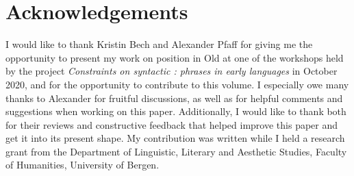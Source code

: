 \documentclass[output=paper,colorlinks,citecolor=brown]{langscibook}
\begin{document}
\section*{Acknowledgements}
I would like to thank Kristin Bech and Alexander Pfaff for giving me the opportunity to present my work on  position in Old  at one of the workshops held by the project \textit{Constraints on syntactic :  phrases in early  languages} in October 2020, and for the opportunity to contribute to this volume. I especially owe many thanks to Alexander for fruitful discussions, as well as for helpful comments and suggestions when working on this paper. Additionally, I would like to thank both for their reviews and constructive feedback that helped improve this paper and get it into its present shape. My contribution was written while I held a research grant from the Department of Linguistic, Literary and Aesthetic Studies, Faculty of Humanities, University of Bergen.




{\sloppy\printbibliography[heading=subbibliography,notkeyword=this]}
\end{document}
